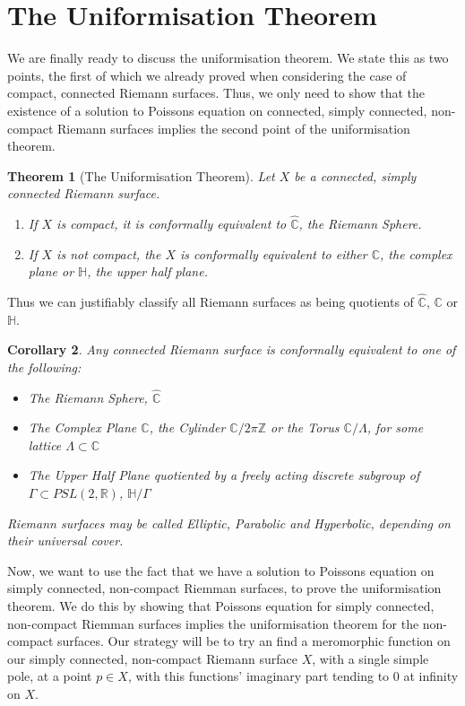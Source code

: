 \documentclass[11pt]{report}
\newtheorem{thm}{Theorem}[section]
\newtheorem{cor}[thm]{Corollary}
\theoremstyle{definition}
\begin{document}
\section{The Uniformisation Theorem}
We are finally ready to discuss the uniformisation theorem. We state this as two points, the first of which we already proved when considering the case of compact, connected Riemann surfaces. Thus, we only need to show that the existence of a solution to Poissons equation on connected, simply connected, non-compact Riemann surfaces implies the second point of the uniformisation theorem.
\begin{thm}[The Uniformisation Theorem]\label{Uniformisation}
  Let $X$ be a connected, simply connected Riemann surface. 
  \begin{enumerate}
    \item If $X$ is compact, it is conformally equivalent to $\widehat{\mathbb{C}}$, the Riemann Sphere. 
    \item If $X$ is not compact, the $X$ is conformally equivalent to either $\mathbb{C}$, the complex plane or $\mathbb{H}$, the upper half plane.
  \end{enumerate}
\end{thm}
Thus we can justifiably classify all Riemann surfaces as being quotients of $\widehat{\mathbb{C}}$, $\mathbb{C}$ or $\mathbb{H}$.
\begin{cor}
  Any connected Riemann surface is conformally equivalent to one of the following:
  \begin{itemize}
    \item The Riemann Sphere, $\widehat{\mathbb{C}}$
    \item The Complex Plane $\mathbb{C}$, the Cylinder $\mathbb{C}/2\pi \mathbb{Z}$ or the Torus $\mathbb{C}/\Lambda$, for some lattice $\Lambda \subset \mathbb{C}$
    \item The Upper Half Plane quotiented by a freely acting discrete subgroup of $\Gamma \subset PSL(2,\mathbb{R})$, $\mathbb{H}/\Gamma$ 
  \end{itemize}
  Riemann surfaces may be called Elliptic, Parabolic and Hyperbolic, depending on their universal cover.
\end{cor}
Now, we want to use the fact that we have a solution to Poissons equation on simply connected, non-compact Riemman surfaces, to prove the uniformisation theorem. We do this by showing that Poissons equation for simply connected, non-compact Riemman surfaces implies the uniformisation theorem for the non-compact surfaces.
Our strategy will be to try an find a meromorphic function on our simply connected, non-compact Riemann surface $X$, with a single simple pole, at a point $p \in X$, with this functions' imaginary part tending to $0$ at infinity on $X$.
\end{document}
